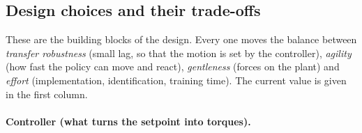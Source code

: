 \clearpage
\subsection{Design choices and their trade-offs}
\label{sec:al-choices}
These are the building blocks of the design. Every one moves the balance between \emph{transfer robustness}
(small lag, so that the motion is set by the controller), \emph{agility} (how fast the policy can move and react),
\emph{gentleness} (forces on the plant) and \emph{effort} (implementation, identification, training time). The
current value is given in the first column.

\paragraph{Controller (what turns the setpoint into torques).}
